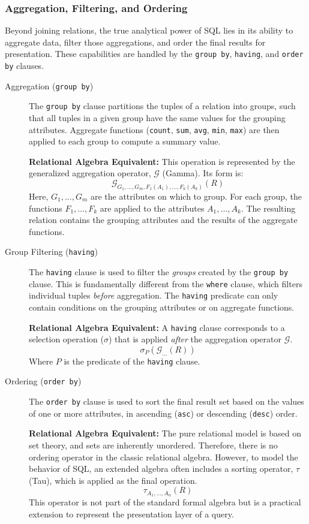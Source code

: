 \subsubsection{Aggregation, Filtering, and Ordering}
Beyond joining relations, the true analytical power of SQL lies in its ability to aggregate data, filter those aggregations, and order the final results for presentation. These capabilities are handled by the \texttt{group by}, \texttt{having}, and \texttt{order by} clauses.

\begin{description}
    \item[Aggregation (\texttt{group by})] The \texttt{group by} clause partitions the tuples of a relation into groups, such that all tuples in a given group have the same values for the grouping attributes. Aggregate functions (\texttt{count}, \texttt{sum}, \texttt{avg}, \texttt{min}, \texttt{max}) are then applied to each group to compute a summary value.

    \textbf{Relational Algebra Equivalent:} This operation is represented by the generalized aggregation operator, $\mathcal{G}$ (Gamma). Its form is:
    \[ \mathcal{G}_{G_1, ..., G_m, F_1(A_1), ..., F_k(A_k)}(R) \]
    Here, $G_1, ..., G_m$ are the attributes on which to group. For each group, the functions $F_1, ..., F_k$ are applied to the attributes $A_1, ..., A_k$. The resulting relation contains the grouping attributes and the results of the aggregate functions.

    \item[Group Filtering (\texttt{having})] The \texttt{having} clause is used to filter the \textit{groups} created by the \texttt{group by} clause. This is fundamentally different from the \texttt{where} clause, which filters individual tuples \textit{before} aggregation. The \texttt{having} predicate can only contain conditions on the grouping attributes or on aggregate functions.

    \textbf{Relational Algebra Equivalent:} A \texttt{having} clause corresponds to a selection operation ($\sigma$) that is applied \textit{after} the aggregation operator $\mathcal{G}$.
    \[ \sigma_{P}(\mathcal{G}_{...}(R)) \]
    Where $P$ is the predicate of the \texttt{having} clause.

    \item[Ordering (\texttt{order by})] The \texttt{order by} clause is used to sort the final result set based on the values of one or more attributes, in ascending (\texttt{asc}) or descending (\texttt{desc}) order.

    \textbf{Relational Algebra Equivalent:} The pure relational model is based on set theory, and sets are inherently unordered. Therefore, there is no ordering operator in the classic relational algebra. However, to model the behavior of SQL, an extended algebra often includes a sorting operator, $\tau$ (Tau), which is applied as the final operation.
    \[ \tau_{A_1, ..., A_n}(R) \]
    This operator is not part of the standard formal algebra but is a practical extension to represent the presentation layer of a query.
\end{description}

